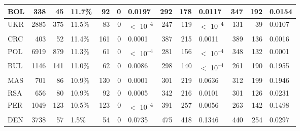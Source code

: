 \begin{tabular}{l|r|r|l|r|r|l|r|r|l|r|r|l}
\hline
BOL & 338 & 45 & 11.7\% & 92 & 0 & 0.0197 & 292 & 178 & 0.0117 & 347 & 192 & 0.0154\\
\hline
UKR & 2885 & 375 & 11.5\% & 83 & 0 & $<$ 10\textsuperscript{--4} & 247 & 119 & $<$ 10\textsuperscript{--4} & 131 & 39 & 0.0107\\
\hline
CRC & 403 & 52 & 11.4\% & 161 & 0 & 0.0001 & 387 & 215 & 0.0011 & 389 & 136 & 0.0016\\
\hline
POL & 6919 & 879 & 11.3\% & 61 & 0 & $<$ 10\textsuperscript{--4} & 281 & 156 & $<$ 10\textsuperscript{--4} & 348 & 132 & 0.0001\\
\hline
BUL & 1146 & 141 & 11.0\% & 62 & 0 & 0.0086 & 298 & 140 & $<$ 10\textsuperscript{--4} & 261 & 190 & 0.1955\\
\hline
MAS & 701 & 86 & 10.9\% & 130 & 0 & 0.0001 & 301 & 219 & 0.0636 & 312 & 199 & 0.1946\\
\hline
RSA & 656 & 80 & 10.9\% & 92 & 0 & 0.0005 & 342 & 216 & 0.0101 & 301 & 126 & 0.0231\\
\hline
PER & 1049 & 123 & 10.5\% & 123 & 0 & $<$ 10\textsuperscript{--4} & 391 & 257 & 0.0056 & 263 & 142 & 0.1498\\
\hline
DEN & 3738 & 57 & 1.5\% & 54 & 0 & 0.0735 & 475 & 418 & 0.1346 & 440 & 254 & 0.0297\\
\hline
\end{tabular}

